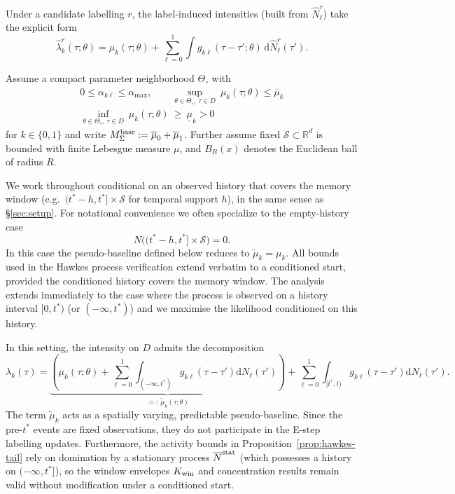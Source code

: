 \documentclass{statsoc}
\newcommand{\dd}{\mathrm{d}}
\newcommand{\bbR}{\mathbb{R}}
\newcommand{\1}{\mathbbm{1}}
\begin{document}
Under a candidate labelling $r$, the label-induced intensities (built from $\widehat N_\ell^r$) take the explicit form
\[
\widehat\lambda_k^r(\tau;\theta)
=\mu_k(\tau;\theta)+\sum_{\ell=0}^1\int g_{k\ell}(\tau-\tau';\theta)\,\dd \widehat N_\ell^r(\tau').
\]


Assume a compact parameter neighborhood $\Theta_\circ$ with
\begin{align*}
0\le \alpha_{k\ell}\le \alpha_{\max},\qquad \sup_{\theta\in\Theta_\circ,\ \tau\in D}\ \mu_k(\tau;\theta)\le \overline\mu_k\\
\inf_{\theta\in\Theta_\circ,\ \tau\in D}\ \mu_k(\tau;\theta)\ \ge\ \underline\mu_k>0
\end{align*}
for \(k\in\{0,1\}\) and write \(M_\Sigma^{\rm base}:=\overline\mu_0+\overline\mu_1\). Further assume fixed $\mathcal S\subset\bbR^d$ is bounded with finite Lebesgue measure $\mu$, and $B_R(x)$ denotes the Euclidean ball of radius $R$.


We work throughout conditional on an observed history that covers the memory window (e.g.\ \((t^\ast-h,t^\ast]\times\mathcal S\) for temporal support \(h\)), in the same sense as \S\ref{sec:setup}. For notational convenience we often specialize to the empty-history case
\begin{equation}\label{eq:Hpre}
\tag{Hpre}
N\big((t^\ast -h,t^\ast]\times\mathcal S\big)=0.
\end{equation}
In this case the pseudo-baseline defined below reduces to \(\tilde\mu_k=\mu_k\).
All bounds used in the Hawkes process verification extend verbatim to a conditioned start, provided the conditioned history covers the memory window. The analysis extends immediately to the case where the process is observed on a history interval $[0,t^\ast)$ (or $(-\infty,t^\ast)$) and we maximise the likelihood conditioned on this history.

In this setting, the intensity on $D$ admits the decomposition
\[
\lambda_k(\tau) = \underbrace{\left(\mu_k(\tau;\theta) + \sum_{\ell=0}^1 \int_{(-\infty,t^\ast)} g_{k\ell}(\tau-\tau') \dd N_\ell(\tau')\right)}_{=:\ \tilde\mu_k(\tau;\theta)} + \sum_{\ell=0}^1 \int_{[t^\ast,t)} g_{k\ell}(\tau-\tau') \dd N_\ell(\tau').
\]
The term $\tilde\mu_k$ acts as a spatially varying, predictable pseudo-baseline. Since the pre-$t^\ast$ events are fixed observations, they do not participate in the E-step labelling updates.
Furthermore, the activity bounds in Proposition~\ref{prop:hawkes-tail} rely on domination by a stationary process $\overline N^{\rm stat}$ (which possesses a history on $(-\infty, t^\ast]$), so the window envelopes $K_{\rm win}$ and concentration results remain valid without modification under a conditioned start.
\end{document}
